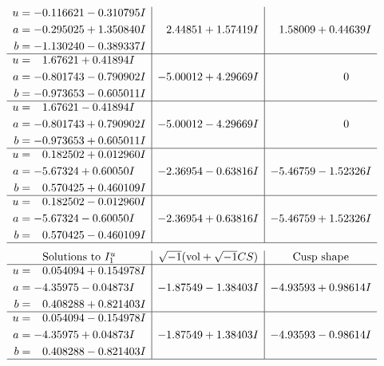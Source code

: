 \documentclass[1p]{elsarticle_modified}
\theoremstyle{definition}
\newcommand{\I}{\sqrt{-1}}
\begin{document}
$$\begin{array}{c|c|c}
\begin{aligned}
u &= -0.116621 - 0.310795 I \\
a &= -0.295025 + 1.350840 I \\
b &= -1.130240 - 0.389337 I\end{aligned}
 & \phantom{-}2.44851 + 1.57419 I & \phantom{-}1.58009 + 0.44639 I \\ \hline\begin{aligned}
u &= \phantom{-}1.67621 + 0.41894 I \\
a &= -0.801743 - 0.790902 I \\
b &= -0.973653 - 0.605011 I\end{aligned}
 & -5.00012 + 4.29669 I & \phantom{-0.000000 } 0 \\ \hline\begin{aligned}
u &= \phantom{-}1.67621 - 0.41894 I \\
a &= -0.801743 + 0.790902 I \\
b &= -0.973653 + 0.605011 I\end{aligned}
 & -5.00012 - 4.29669 I & \phantom{-0.000000 } 0 \\ \hline\begin{aligned}
u &= \phantom{-}0.182502 + 0.012960 I \\
a &= -5.67324 + 0.60050 I \\
b &= \phantom{-}0.570425 + 0.460109 I\end{aligned}
 & -2.36954 - 0.63816 I & -5.46759 - 1.52326 I \\ \hline\begin{aligned}
u &= \phantom{-}0.182502 - 0.012960 I \\
a &= -5.67324 - 0.60050 I \\
b &= \phantom{-}0.570425 - 0.460109 I\end{aligned}
 & -2.36954 + 0.63816 I & -5.46759 + 1.52326 I\\
 \hline 
 \end{array}$$\newpage$$\begin{array}{c|c|c}  
\text{Solutions to }I^u_{1}& \I (\text{vol} + \sqrt{-1}CS) & \text{Cusp shape}\\
 \hline 
\begin{aligned}
u &= \phantom{-}0.054094 + 0.154978 I \\
a &= -4.35975 - 0.04873 I \\
b &= \phantom{-}0.408288 + 0.821403 I\end{aligned}
 & -1.87549 - 1.38403 I & -4.93593 + 0.98614 I \\ \hline\begin{aligned}
u &= \phantom{-}0.054094 - 0.154978 I \\
a &= -4.35975 + 0.04873 I \\
b &= \phantom{-}0.408288 - 0.821403 I\end{aligned}
 & -1.87549 + 1.38403 I & -4.93593 - 0.98614 I\\
 \hline 
 \end{array}$$\newpage\newpage\renewcommand{\arraystretch}{1}
\end{document}
